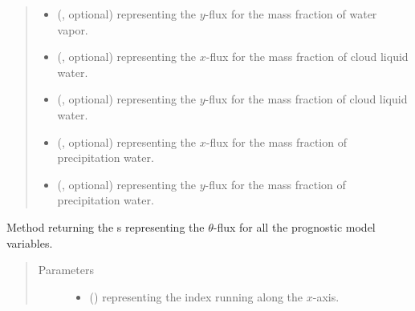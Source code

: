 \documentclass[letterpaper,10pt,english]{sphinxmanual}
\begin{document}
\begin{fulllineitems}
\begin{fulllineitems}
\begin{quote}
\begin{description}
\begin{itemize}
\item {} 
 (, optional) \textendash{}  representing the \(y\)-flux for the mass fraction of water vapor.

\item {} 
 (, optional) \textendash{}  representing the \(x\)-flux for the mass fraction of cloud liquid water.

\item {} 
 (, optional) \textendash{}  representing the \(y\)-flux for the mass fraction of cloud liquid water.

\item {} 
 (, optional) \textendash{}  representing the \(x\)-flux for the mass fraction of precipitation water.

\item {} 
 (, optional) \textendash{}  representing the \(y\)-flux for the mass fraction of precipitation water.

\end{itemize}


\end{description}\end{quote}

\end{fulllineitems}


\begin{fulllineitems}
\label{\detokenize{api:tasmania.dycore.flux_isentropic_nonconservative.FluxIsentropicNonconservative.get_vertical_fluxes}}
Method returning the s representing the \(\theta\)-flux for all
the prognostic model variables.
\begin{quote}\begin{description}
\item[{Parameters}] \leavevmode\begin{itemize}
\item {} 
 () \textendash{}  representing the index running along the \(x\)-axis.


\end{itemize}
\end{description}
\end{quote}
\end{fulllineitems}
\end{fulllineitems}
\end{document}
